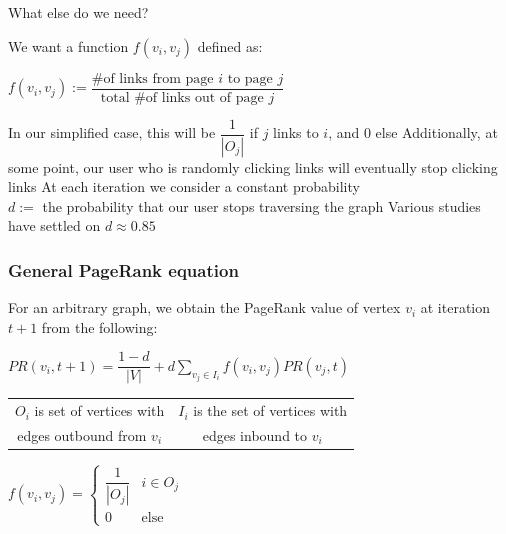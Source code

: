 \documentclass{beamer}
\begin{document}
\begin{frame}[t]{What else do we need?}
    \begin{outline}
        \1 We want a function $f(v_i, v_j)$ defined as:
        \begin{mdframed}[backgroundcolor=blue!20]
            \begin{center}
                $f(v_i, v_j) := \dfrac{\text{\# of links from page }i\text{ to page }j}{\text{total \# of links out of page }j}$        
            \end{center}    
        \end{mdframed}
        \1 In our simplified case, this will be $\dfrac{1}{|O_j|}$ if $j$ links to $i$, and 0 else
        \1 Additionally, at some point, our user who is randomly clicking links will eventually stop clicking links
        \1 At each iteration we consider a constant probability\\ $d :=$ the probability that our user stops traversing the graph
            \2 Various studies have settled on $d\approx 0.85$
    \end{outline}
\end{frame}

\begin{frame}[t]
\frametitle{General PageRank equation}
\begin{outline}
    \1 For an arbitrary graph, we obtain the PageRank value of vertex $v_i$ at iteration $t + 1$ from the following: 
    \begin{mdframed}[backgroundcolor=blue!20]
        \begin{center}
            \begin{math}
                PR(v_i, t+1) = \dfrac{1-d}{|V|} + d\sum\limits_{v_j \in I_i} f(v_i, v_j) PR(v_j, t)
            \end{math}
        \end{center}
    \end{mdframed}
    \vspace{1em}

    \begin{tabular}{cc}
        $O_i$ is set of vertices with & $I_i$ is the set of vertices with \\
        edges outbound from $v_i$ & edges inbound to $v_i$\\
    \end{tabular}

    \vspace{1em}

    \begin{center}
        $f(v_i, v_j)=\begin{cases} 
            \dfrac{1}{|O_j|} & i \in O_j\\
            0 & \text{else} 
         \end{cases}$\\
    \end{center}
\end{outline}
\end{frame}
\end{document}
